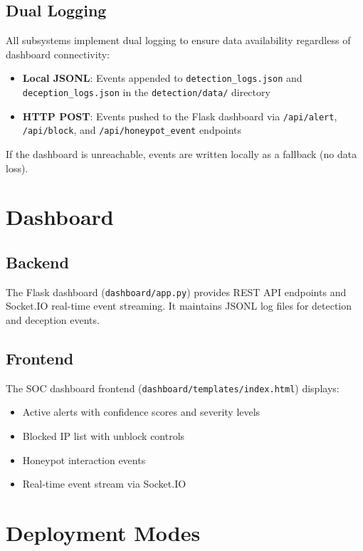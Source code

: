 \documentclass[12pt,a4paper]{report}
\begin{document}
\subsection{Dual Logging}

All subsystems implement dual logging to ensure data availability regardless of dashboard connectivity:

\begin{itemize}
    \item \textbf{Local JSONL}: Events appended to \texttt{detection\_logs.json} and \texttt{deception\_logs.json} in the \texttt{detection/data/} directory
    \item \textbf{HTTP POST}: Events pushed to the Flask dashboard via \texttt{/api/alert}, \texttt{/api/block}, and \texttt{/api/honeypot\_event} endpoints
\end{itemize}

If the dashboard is unreachable, events are written locally as a fallback (no data loss).

\section{Dashboard}

\subsection{Backend}

The Flask dashboard (\texttt{dashboard/app.py}) provides REST API endpoints and Socket.IO real-time event streaming. It maintains JSONL log files for detection and deception events.

\subsection{Frontend}

The SOC dashboard frontend (\texttt{dashboard/templates/index.html}) displays:
\begin{itemize}
    \item Active alerts with confidence scores and severity levels
    \item Blocked IP list with unblock controls
    \item Honeypot interaction events
    \item Real-time event stream via Socket.IO
\end{itemize}

\section{Deployment Modes}
\end{document}

